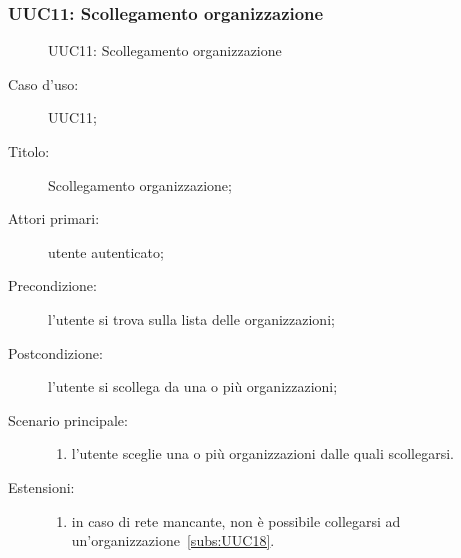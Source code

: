 \documentclass[../../../analisi-dei-requisiti.tex]{subfiles}
\begin{document}
\subsubsection{UUC11: Scollegamento organizzazione}%
\label{subs:UUC11}

\begin{figure}[H]
  \centering
  \caption{UUC11: Scollegamento organizzazione}%
  \label{fig:UUC11}
\end{figure}

\begin{description}
  \item[Caso d'uso:] UUC11;
  \item[Titolo:] Scollegamento organizzazione;
  \item[Attori primari:] utente autenticato;
  \item[Precondizione:] l'utente si trova sulla lista delle organizzazioni;
  \item[Postcondizione:] l'utente si scollega da una o più organizzazioni;
  \item[Scenario principale:]
        \begin{enumerate}
          \item l'utente sceglie una o più organizzazioni dalle quali scollegarsi.
        \end{enumerate}
  \item[Estensioni:]
        \begin{enumerate}
          \item in caso di rete mancante, non è possibile collegarsi ad un'organizzazione~\ref{subs:UUC18}.
        \end{enumerate}
\end{description}
\end{document}
